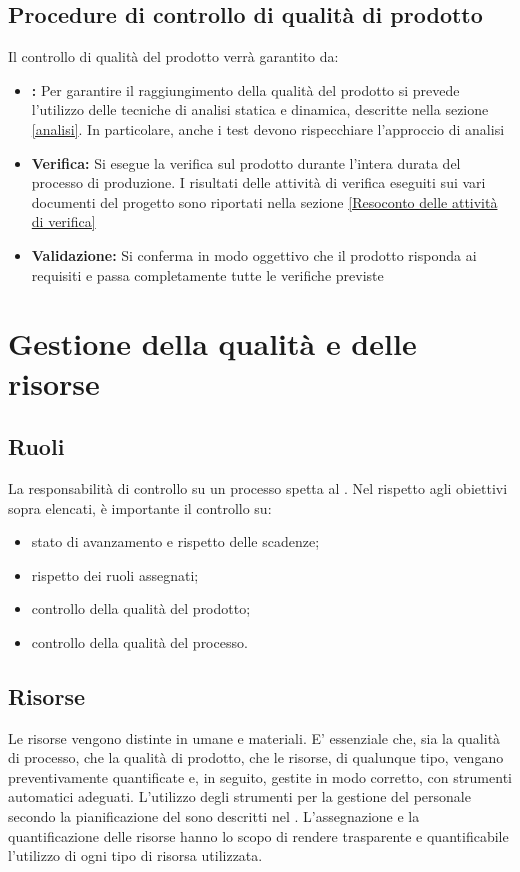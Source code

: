 \documentclass[12pt,a4paper]{article}
\begin{document}
\subsection{Procedure di controllo di qualità di prodotto}\label{sec:procedure-di-controllo-di-qualità-di-prodotto}
Il controllo di qualità del prodotto verrà garantito da:
\begin{itemize}
	\item \textbf{:} Per garantire il raggiungimento della qualità del prodotto si prevede l'utilizzo delle tecniche di analisi statica e dinamica, descritte nella sezione \ref{analisi}. In particolare, anche i test devono rispecchiare l'approccio  di analisi
	\item \textbf{Verifica:} Si esegue la verifica sul prodotto durante l'intera durata del processo di produzione. I risultati delle attività di verifica eseguiti sui vari documenti del progetto sono riportati nella sezione \ref{Resoconto delle attività di verifica}
	\item \textbf{Validazione:} Si conferma in modo oggettivo che il prodotto risponda ai requisiti e passa completamente tutte le verifiche previste
\end{itemize}

\newpage

\section{Gestione della qualità e delle risorse}
\subsection{Ruoli}
La responsabilità di controllo su un processo spetta al \PM{}. Nel rispetto agli obiettivi sopra elencati, è importante il controllo su:
\begin{itemize}
	\item stato di avanzamento e rispetto delle scadenze;
	\item rispetto dei ruoli assegnati;
	\item controllo della qualità del prodotto;
	\item controllo della qualità del processo. 
\end{itemize}

\subsection{Risorse}
Le risorse vengono distinte in umane e materiali. E' essenziale che, sia la qualità di processo, che la qualità di prodotto, che le risorse, di qualunque tipo, vengano preventivamente quantificate e, in seguito, gestite in modo corretto, con strumenti automatici adeguati.
L'utilizzo degli strumenti per la gestione del personale secondo la pianificazione del \PdP{} sono descritti nel \NdP. L'assegnazione e la quantificazione delle risorse hanno lo scopo di rendere trasparente e quantificabile l'utilizzo di ogni tipo di risorsa utilizzata.
\end{document}
